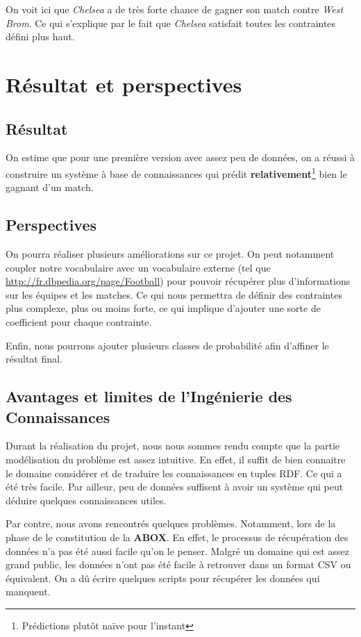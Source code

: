 \documentclass[oneside,13pt,a4paper]{article}
\begin{document}
On voit ici que \textit{Chelsea} a de très forte chance de gagner son match contre \textit{West Brom}.
Ce qui s'explique par le fait que \textit{Chelsea} satisfait toutes les contraintes défini plus haut.

\section{Résultat et perspectives}

\subsection{Résultat}

On estime que pour une première version avec assez peu de données, on a réussi à construire un système à base de connaissances qui prédit \textbf{relativement}\footnote{Prédictions plutôt naïve pour l'instant} bien le gagnant d'un match.

\subsection{Perspectives}

On pourra réaliser plusieurs améliorations sur ce projet. On peut notamment coupler notre vocabulaire avec un vocabulaire externe (tel que \url{http://fr.dbpedia.org/page/Football}) pour pouvoir récupérer plus d’informations sur les équipes et les matches. Ce qui nous permettra de définir des contraintes plus complexe, plus ou moins forte, ce qui implique d’ajouter une sorte de coefficient pour chaque contrainte.

Enfin, nous pourrons ajouter plusieurs classes de probabilité afin d'affiner le résultat final.

\subsection{Avantages et limites de l’Ingénierie des Connaissances}

Durant la réalisation du projet, nous nous sommes rendu compte que la partie modélisation du problème est assez intuitive. En effet, il suffit de bien connaitre le domaine considérer et de traduire les connaissances en tuples RDF. Ce qui a été très facile. Par ailleur, peu de données suffisent à avoir un système qui peut déduire quelques connaissances utiles.

Par contre, nous avons rencontrés quelques problèmes. Notamment, lors de la phase de le constitution de la \textbf{ABOX}. En effet, le processus de récupération des données n'a pas été aussi facile qu'on le penser. Malgré un domaine qui est assez grand public, les données n'ont pas été facile à retrouver dans un format CSV ou équivalent. On a dû écrire quelques scripts pour récupérer les données qui manquent.
\end{document}
